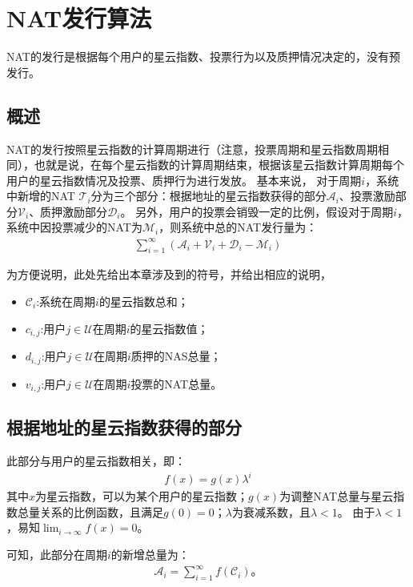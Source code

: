 
\section{NAT发行算法}

NAT的发行是根据每个用户的星云指数、投票行为以及质押情况决定的，没有预发行。

\subsection{概述}
NAT的发行按照星云指数的计算周期进行（注意，投票周期和星云指数周期相同），也就是说，在每个星云指数的计算周期结束，根据该星云指数计算周期每个用户的星云指数情况及投票、质押行为进行发放。
基本来说，
对于周期$i$，系统中新增的NAT $\mathcal{T}_i$分为三个部分：根据地址的星云指数获得的部分$\mathcal{A}_i$、投票激励部分$\mathcal{V}_i$、质押激励部分$\mathcal{D}_i$。
另外，用户的投票会销毁一定的比例，假设对于周期$i$，系统中因投票减少的NAT为$\mathcal{M}_i$，则系统中总的NAT发行量为：
\begin{align}
\sum_{i=1}^{\infty} (\mathcal{A}_i + \mathcal{V}_i + \mathcal{D}_i - \mathcal{M}_i)
\end{align}

为方便说明，此处先给出本章涉及到的符号，并给出相应的说明，
\begin{itemize}
\item $\mathcal{C}_i$:系统在周期$i$的星云指数总和；
\item $c_{i,j}$:用户$j \in \mathcal{U}$在周期$i$的星云指数值；
\item $d_{i,j}$:用户$j \in \mathcal{U}$在周期$i$质押的NAS总量；
\item $v_{i,j}$:用户$j \in \mathcal{U}$在周期$i$投票的NAT总量。
\end{itemize}

\subsection{根据地址的星云指数获得的部分}
此部分与用户的星云指数相关，即：
\begin{align}
    f(x) = g(x)\lambda^i
\end{align}
\noindent 其中$x$为星云指数，可以为某个用户的星云指数；$g(x)$为调整NAT总量与星云指数总量关系的比例函数，且满足$g(0) = 0$；$\lambda$为衰减系数，且$\lambda < 1$。
由于$\lambda < 1$，易知$\lim_{i\to \infty}f(x) = 0$。

可知，此部分在周期$i$的新增总量为：
\begin{align}
\mathcal{A}_i = \sum_{i=1}^{\infty}f(\mathcal{C}_i)。
\end{align}

